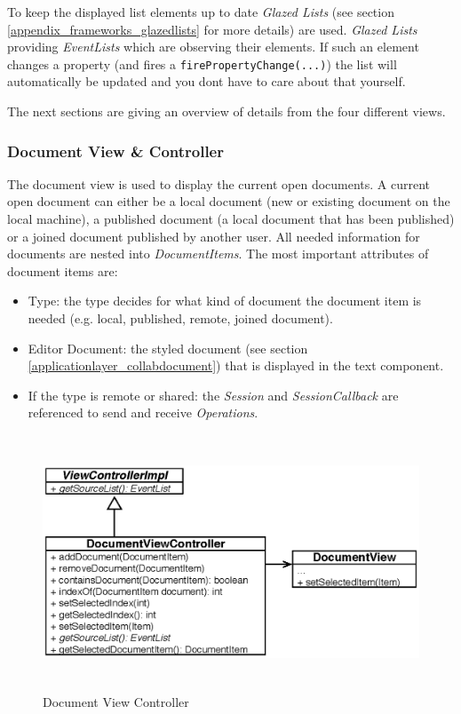 To keep the displayed list elements up to date \textit{Glazed Lists} (see section \ref{appendix_frameworks_glazedlists} for more details) are used. \textit{Glazed Lists} providing \textit{EventLists} which are observing their elements. If such an element changes a property (and fires a \texttt{firePropertyChange(...)}) the list will automatically be updated and you dont have to care about that yourself.

The next sections are giving an overview of details from the four different views.

\subsubsection{Document View \& Controller}
The document view is used to display the current open documents. A current open document can either be a local document (new or existing document on the local machine), a published document (a local document that has been published) or a joined document published by another user. All needed information for documents are nested into \textit{DocumentItems}. The most important attributes of document items are:
\begin{itemize}
\item Type: the type decides for what kind of document the document item is needed (e.g. local, published, remote, joined document).
\item Editor Document: the styled document (see section \ref{applicationlayer_collabdocument}) that is displayed in the text component.
\item If the type is remote or shared: the \textit{Session} and \textit{SessionCallback} are referenced to send and receive \textit{Operations}.
\end{itemize}
\begin{figure}[H]
\begin{center}
  \includegraphics[height=2.99in, width=5.62in]{../images/finalreport/application_documentview.eps}
\caption{Document View Controller}
\label{application_documentview}
\end{center}
\end{figure}
